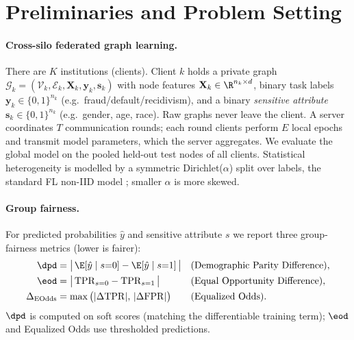 \section{Preliminaries and Problem Setting}
\label{sec:prelim}

\paragraph{Cross-silo federated graph learning.}
There are $K$ institutions (clients). Client $k$ holds a private graph
$\mathcal{G}_k=(\mathcal{V}_k,\mathcal{E}_k,\mathbf{X}_k,\mathbf{y}_k,\mathbf{s}_k)$
with node features $\mathbf{X}_k\in\R^{n_k\times d}$, binary task labels
$\mathbf{y}_k\in\{0,1\}^{n_k}$ (e.g.\ fraud/default/recidivism), and a binary
\emph{sensitive attribute} $\mathbf{s}_k\in\{0,1\}^{n_k}$ (e.g.\ gender, age,
race). Raw graphs never leave the client. A server coordinates $T$
communication rounds; each round clients perform $E$ local epochs and transmit
model parameters, which the server aggregates. We evaluate the global model on
the pooled held-out test nodes of all clients. Statistical heterogeneity is
modelled by a symmetric Dirichlet($\alpha$) split over labels, the standard FL
non-IID model \cite{hsu2019measuring}; smaller $\alpha$ is more skewed.

\paragraph{Group fairness.}
For predicted probabilities $\hat{y}$ and sensitive attribute $s$ we report
three group-fairness metrics (lower is fairer):
\begin{align}
\dpd &= \big|\,\E[\hat{y}\mid s{=}0]-\E[\hat{y}\mid s{=}1]\,\big|
        &&\text{(Demographic Parity Difference)},\\
\eod &= \big|\,\mathrm{TPR}_{s=0}-\mathrm{TPR}_{s=1}\,\big|
        &&\text{(Equal Opportunity Difference)},\\
\Delta_{\mathrm{EOdds}} &= \max\big(|\Delta\mathrm{TPR}|,\,|\Delta\mathrm{FPR}|\big)
        &&\text{(Equalized Odds)} .
\end{align}
$\dpd$ is computed on soft scores (matching the differentiable training term);
$\eod$ and Equalized Odds use thresholded predictions.

